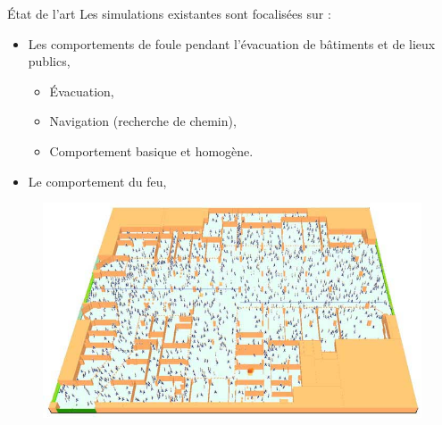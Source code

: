 \documentclass{beamer}
\begin{document}
    \begin{frame}{État de l'art}
        Les simulations existantes sont focalisées sur :
        \begin{itemize}
            \item Les comportements de foule pendant l'évacuation de bâtiments et de lieux publics,\cite{modeling2008}\cite{human2006}\cite{crowd2005}
            \begin{itemize}
                \item Évacuation,
                \item Navigation (recherche de chemin),
                \item Comportement basique et homogène.
            \end{itemize}
            \item Le comportement du feu, \cite{phoenix}
        \end{itemize}
        \begin{figure}[h]
            \includegraphics[scale=0.4]{eva.jpg}
        \end{figure}
    \end{frame}
\end{document}
